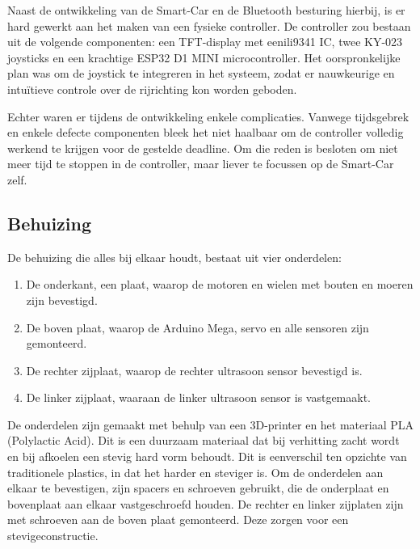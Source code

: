 Naast de ontwikkeling van de \gls{Smart-Car} en de \gls{Bluetooth} besturing hierbij, is er hard gewerkt aan het maken van een fysieke controller. De controller zou bestaan uit de volgende componenten: een TFT-display met een\gls{ili9341}\cite{ILI3941} IC, twee KY-023 joysticks en een krachtige ESP32 D1 MINI \gls{microcontroller}. 
Het oorspronkelijke plan was om de joystick te integreren in het systeem, zodat er nauwkeurige en intuïtieve controle over de rijrichting kon worden geboden.

Echter waren er tijdens de ontwikkeling enkele complicaties. Vanwege tijdsgebrek en enkele defecte componenten bleek het niet haalbaar om de controller volledig werkend te krijgen voor de gestelde deadline. Om die reden is besloten om niet meer tijd te stoppen in de controller, maar liever te focussen op de \gls{Smart-Car} zelf.

\subsection{Behuizing}
De behuizing die alles bij elkaar houdt, bestaat uit vier onderdelen:
\begin{enumerate}
\item De onderkant, een plaat, waarop de motoren en wielen met bouten en moeren zijn bevestigd.\item De boven plaat, waarop de Arduino Mega, servo en alle sensoren zijn gemonteerd.
\item De rechter zijplaat, waarop de rechter ultrasoon sensor bevestigd is.
\item De linker zijplaat, waaraan de linker ultrasoon sensor is vastgemaakt.
\end{enumerate}
De onderdelen zijn gemaakt met behulp van een 3D-printer en het materiaal PLA (Polylactic Acid). Dit is een duurzaam materiaal dat bij verhitting zacht wordt en bij afkoelen een stevig hard vorm behoudt. Dit is eenverschil ten opzichte van traditionele plastics, in dat het harder en steviger is. Om de onderdelen aan elkaar te bevestigen, zijn spacers en schroeven gebruikt, die de onderplaat en bovenplaat aan elkaar vastgeschroefd houden. De rechter en linker zijplaten zijn met schroeven aan de boven plaat gemonteerd. Deze zorgen voor een stevigeconstructie.
